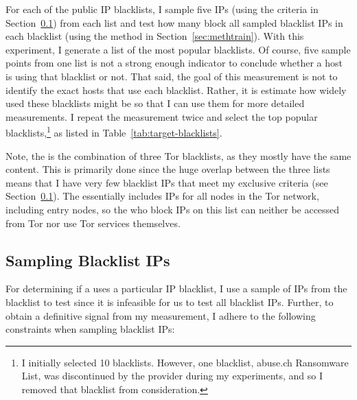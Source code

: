 For each of the public IP blacklists, I sample five IPs (using the criteria
in Section~\ref{sec:methtarg}) from each list and test how many {}
block all sampled blacklist IPs in each blacklist (using the method in
Section~\ref{sec:methtrain}). With this experiment, I
generate a list of the most popular blacklists. Of course, five sample points
from one list is not a strong enough indicator to conclude whether a host is
using that blacklist or not. That said, the goal of this measurement is not to
identify the exact hosts that use each blacklist. Rather, it is
estimate how widely used these blacklists might be so that I can use them for more detailed measurements. I
repeat the measurement twice and select the top {\blacklistnum} popular
blacklists,\footnote{I initially selected 10 blacklists. However, one blacklist,
abuse.ch Ransomware List, was discontinued by the provider during my
experiments, and so I removed that blacklist from consideration.} as listed in
Table~\ref{tab:target-blacklists}.

Note, the {\ettor} is the combination of three Tor blacklists, as they mostly
have the same content. This is primarily done since the huge overlap between
the three lists means that I have very few blacklist IPs that meet my
exclusive criteria (see Section~\ref{sec:methtarg}). The {\ettor} essentially
includes IPs for all nodes in the Tor network, including entry nodes, so the
{} who block IPs on this list can neither be accessed from Tor nor
use Tor services themselves.

\subsection{Sampling Blacklist IPs}
\label{sec:methtarg}

For determining if a {} uses a particular IP blacklist, I use a
sample of IPs from the blacklist to test since it is infeasible for us to
test all blacklist IPs. Further, to obtain a definitive signal from my
measurement, I adhere to the following constraints when sampling blacklist
IPs:

